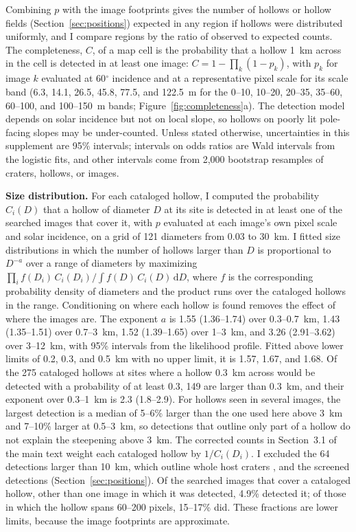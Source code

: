 \documentclass{planetary}
\begin{document}
Combining $p$ with the image footprints gives the number of hollows or hollow fields (Section~\ref{sec:positions}) expected in any region if hollows were distributed uniformly, and I compare regions by the ratio of observed to expected counts. The completeness, $C$, of a map cell is the probability that a hollow 1~km across in the cell is detected in at least one image: $C = 1 - \prod_k (1 - p_k)$, with $p_k$ for image $k$ evaluated at 60$^\circ$ incidence and at a representative pixel scale for its scale band (6.3, 14.1, 26.5, 45.8, 77.5, and 122.5~m for the 0--10, 10--20, 20--35, 35--60, 60--100, and 100--150~m bands; Figure~\ref{fig:completeness}a). The detection model depends on solar incidence but not on local slope, so hollows on poorly lit pole-facing slopes may be under-counted. Unless stated otherwise, uncertainties in this supplement are 95\% intervals; intervals on odds ratios are Wald intervals from the logistic fits, and other intervals come from 2,000 bootstrap resamples of craters, hollows, or images.

\textbf{Size distribution.} For each cataloged hollow, I computed the probability $C_i(D)$ that a hollow of diameter $D$ at its site is detected in at least one of the searched images that cover it, with $p$ evaluated at each image's own pixel scale and solar incidence, on a grid of 121 diameters from 0.03 to 30~km. I fitted size distributions in which the number of hollows larger than $D$ is proportional to $D^{-a}$ over a range of diameters by maximizing $\prod_i f(D_i)\,C_i(D_i) / \int f(D)\,C_i(D)\,\mathrm{d}D$, where $f$ is the corresponding probability density of diameters and the product runs over the cataloged hollows in the range. Conditioning on where each hollow is found removes the effect of where the images are. The exponent $a$ is 1.55 (1.36--1.74) over 0.3--0.7~km, 1.43 (1.35--1.51) over 0.7--3~km, 1.52 (1.39--1.65) over 1--3~km, and 3.26 (2.91--3.62) over 3--12~km, with 95\% intervals from the likelihood profile. Fitted above lower limits of 0.2, 0.3, and 0.5~km with no upper limit, it is 1.57, 1.67, and 1.68. Of the 275 cataloged hollows at sites where a hollow 0.3~km across would be detected with a probability of at least 0.3, 149 are larger than 0.3~km, and their exponent over 0.3--1~km is 2.3 (1.8--2.9). For hollows seen in several images, the largest detection is a median of 5--6\% larger than the one used here above 3~km and 7--10\% larger at 0.5--3~km, so detections that outline only part of a hollow do not explain the steepening above 3~km. The corrected counts in Section~3.1 of the main text weight each cataloged hollow by $1/C_i(D_i)$. I excluded the 64 detections larger than 10~km, which outline whole host craters \parencite{bickel2025}, and the screened detections (Section~\ref{sec:positions}). Of the searched images that cover a cataloged hollow, other than one image in which it was detected, 4.9\% detected it; of those in which the hollow spans 60--200 pixels, 15--17\% did. These fractions are lower limits, because the image footprints are approximate.
\end{document}
